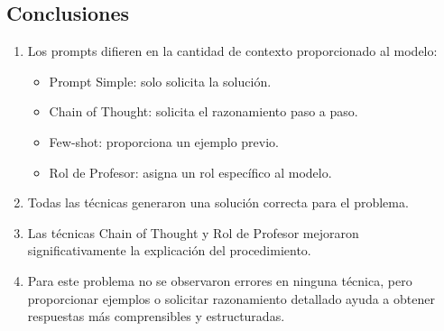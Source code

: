 \documentclass[12pt,a4paper]{article}
\begin{document}
\subsection{Conclusiones}

\begin{enumerate}  
    \item Los prompts difieren en la cantidad de contexto proporcionado al modelo:
    \begin{itemize}
        \item Prompt Simple: solo solicita la solución.
        \item Chain of Thought: solicita el razonamiento paso a paso.
        \item Few-shot: proporciona un ejemplo previo.
        \item Rol de Profesor: asigna un rol específico al modelo.
    \end{itemize}
    
    \item Todas las técnicas generaron una solución correcta para el problema.
    
    \item Las técnicas Chain of Thought y Rol de Profesor mejoraron significativamente la explicación del procedimiento.
    
    \item Para este problema no se observaron errores en ninguna técnica, pero proporcionar ejemplos o solicitar razonamiento detallado ayuda a obtener respuestas más comprensibles y estructuradas.
\end{enumerate}
\end{document}

